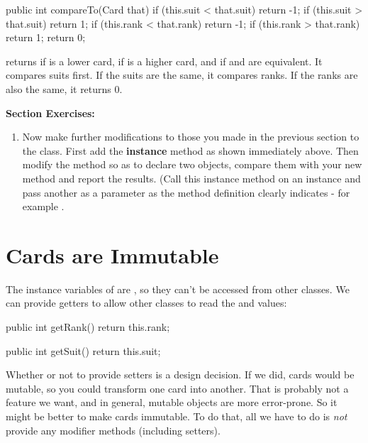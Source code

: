 \begin{code}
public int compareTo(Card that) {
    if (this.suit < that.suit) {
        return -1;
    }
    if (this.suit > that.suit) {
        return 1;
    }
    if (this.rank < that.rank) {
        return -1;
    }
    if (this.rank > that.rank) {
        return 1;
    }
    return 0;
}
\end{code}

 returns  if  is a lower card,  if  is a higher card, and  if  and  are equivalent.
It compares suits first.
If the suits are the same, it compares ranks.
If the ranks are also the same, it returns 0.

\textbf{Section Exercises:}
\begin{enumerate}
\item Now make further modifications to those you made in the previous section to the  class.  First add the  \textbf{instance} method as shown immediately above.  Then modify the  method so as to declare two  objects, compare them with your new method and report the results. (Call this instance method on an instance and pass another as a parameter as the method definition clearly indicates - for example .
\end{enumerate}

\section{Cards are Immutable}

The instance variables of  are , so they can't be accessed from other classes.
We can provide getters to allow other classes to read the  and  values:

\begin{code}
public int getRank() {
    return this.rank;
}

public int getSuit() {
    return this.suit;
}
\end{code}


Whether or not to provide setters is a design decision.
If we did, cards would be mutable, so you could transform one card into another.
That is probably not a feature we want, and in general, mutable objects are more error-prone.
So it might be better to make cards immutable.
To do that, all we have to do is {\em not} provide any modifier methods (including setters).


